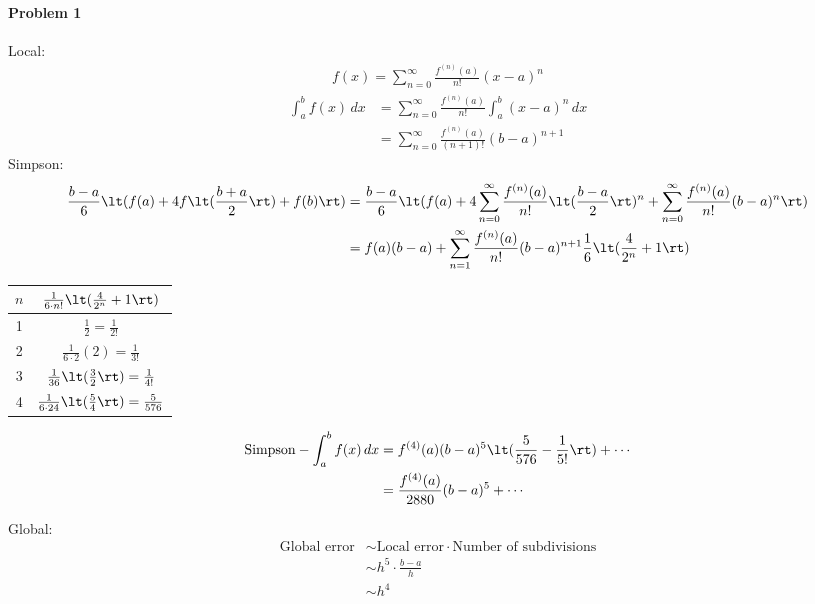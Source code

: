 \documentclass[12pt, oneside, letterpaper, fleqn]{article}
\begin{document}
\paragraph{Problem 1}
Local:
\begin{align*}
f(x) = \sum_{n=0}^\infty \frac{f^{(n)}(a)}{n!}(x-a)^n
\end{align*}
\begin{align*}
\int_a^b f(x)\,dx &= \sum_{n=0}^\infty \frac{f^{(n)}(a)}{n!} \int_a^b
(x-a)^n\,dx\\
&= \sum_{n=0}^\infty \frac{f^{(n)}(a)}{(n+1)!} (b-a)^{n+1}
\end{align*}
Simpson:
\begin{align*}
\frac{b-a}{6}\lt(f(a) + 4f\lt(\frac{b+a}{2}\rt) + f(b)\rt)
&= \frac{b-a}{6}\lt(f(a) + 4\sum_{n=0}^\infty \frac{f^{(n)}(a)}{n!}
\lt(\frac{b-a}{2}\rt)^n + \sum_{n=0}^\infty \frac{f^{(n)}(a)}{n!}
(b-a)^n \rt)\\
&= f(a)(b-a) + \sum_{n=1}^\infty \frac{f^{(n)}(a)}{n!}(b-a)^{n+1}
\frac{1}{6}\lt(\frac{4}{2^n} + 1\rt)
\end{align*}
\begin{table}[htbp]
\renewcommand{\arraystretch}{2}
\begin{tabular}{c | c}
\hline\hline
$n$ & $\frac{1}{6 \cdot n!}\lt(\frac{4}{2^n}+1\rt)$\\
\hline
1 & $\frac{1}{2} = \frac{1}{2!}$\\
2 & $\frac{1}{6\cdot 2}(2) = \frac{1}{3!}$\\
3 & $\frac{1}{36}\lt(\frac{3}{2}\rt) = \frac{1}{4!}$\\
4 & $\frac{1}{6\cdot 24}\lt(\frac{5}{4}\rt) = \frac{5}{576}$\\
\hline
\end{tabular}
\end{table}

\begin{align*}
\text{Simpson} - \int_a^b f(x)\,dx &= f^{(4)}(a)(b-a)^{5}
\lt(\frac{5}{576} - \frac{1}{5!}\rt) + \dotsb\\
&= \frac{f^{(4)}(a)}{2880} (b-a)^{5} + \dotsb
\end{align*}

Global:
\begin{align*}
\text{Global error} &\sim \text{Local error} \cdot \text{Number of
subdivisions}\\
&\sim h^5 \cdot \frac{b-a}{h}\\
&\sim h^4
\end{align*}

\pagebreak
\end{document}
